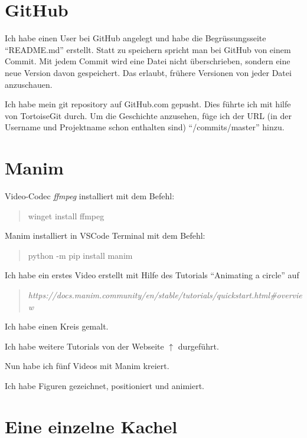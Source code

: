 \documentclass[a4paper]{article} %
\begin{document}
    \section{GitHub} %
  
    Ich habe einen User bei GitHub angelegt 
    und habe die Begrüssungsseite ``README.md'' erstellt.
    Statt zu speichern spricht man bei GitHub von einem Commit.
    Mit jedem Commit wird eine Datei nicht überschrieben,
    sondern eine neue Version davon gespeichert.
    Das erlaubt, frühere Versionen von jeder Datei anzuschauen.
    
    Ich habe mein git repository auf GitHub.com gepusht.
    Dies führte ich mit hilfe von TortoiseGit durch.
    Um die Geschichte anzusehen, füge ich der URL (in der Username und Projektname schon 
    enthalten sind) ``/commits/master'' hinzu.
      
    \section{Manim} %

    Video-Codec \textsl{ffmpeg} installiert mit dem Befehl:
    \begin{quote}
        winget install ffmpeg
    \end{quote}
   
    Manim installiert in VSCode Terminal mit dem Befehl:
    \begin{quote}
        python -m pip install manim
    \end{quote}
    
    Ich habe ein erstes Video erstellt mit Hilfe des Tutorials 
    ``Animating a circle'' auf
    \begin{quote}
        \textsl{https://docs.manim.community/en/stable/tutorials/quickstart.html\#overview}
    \end{quote}

    Ich habe einen Kreis gemalt.

    Ich habe weitere Tutorials von der Webseite $\uparrow$ durgeführt.
    
    Nun habe ich fünf Videos mit Manim kreiert.
    
    Ich habe Figuren gezeichnet, positioniert und animiert.

    \section{Eine einzelne Kachel} %
\end{document}
